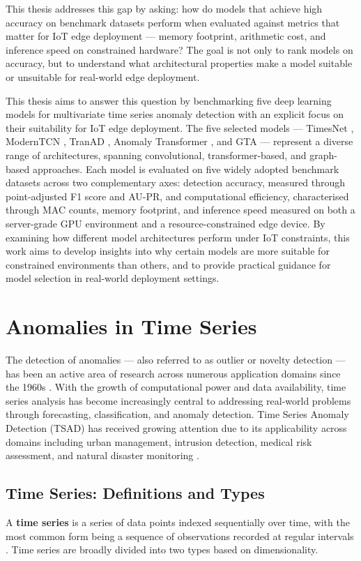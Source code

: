 \documentclass[twoside,11pt,openright]{report}
\begin{document}
This thesis addresses this gap by asking: how do models that achieve high accuracy
on benchmark datasets perform when evaluated against metrics that matter for IoT
edge deployment --- memory footprint, arithmetic cost, and inference speed on
constrained hardware? The goal is not only to rank models on accuracy, but to
understand what architectural properties make a model suitable or unsuitable for
real-world edge deployment.

This thesis aims to answer this question by benchmarking five deep learning models for
multivariate time series anomaly detection with an explicit focus on their
suitability for IoT edge deployment. The five selected models --- TimesNet
\citep{timesnet2023}, ModernTCN \citep{moderntcn2024}, TranAD \citep{tranad2022},
Anomaly Transformer \citep{anomalytransformer2022}, and GTA \citep{gta2022} ---
represent a diverse range of architectures, spanning
convolutional, transformer-based, and graph-based approaches. Each model is
evaluated on five widely adopted benchmark datasets across two complementary axes:
detection accuracy, measured through point-adjusted F1 score and AU-PR, and
computational efficiency, characterised through MAC counts, memory footprint, and
inference speed measured on both a server-grade GPU environment and a
resource-constrained edge device. By examining how different model architectures
perform under IoT constraints, this work aims to develop insights into why certain
models are more suitable for constrained environments than others, and to provide
practical guidance for model selection in real-world deployment settings.

\section{Anomalies in Time Series}
The detection of anomalies --- also referred to as outlier or novelty detection --- has been an active area of research across numerous application domains since the 1960s \citep{darban2024survey}.
With the growth of computational power and data availability, time series analysis has become increasingly central to addressing real-world problems through forecasting, classification, and anomaly detection.
Time Series Anomaly Detection (TSAD) has received growing attention due to its applicability across domains including urban management, intrusion detection, medical risk assessment, and natural disaster monitoring \citep{darban2024survey}.

\subsection{Time Series: Definitions and Types}
A \textbf{time series} is a series of data points indexed sequentially over time, with the most common form being a sequence of observations recorded at regular intervals \citep{darban2024survey}.
Time series are broadly divided into two types based on dimensionality.
\end{document}

